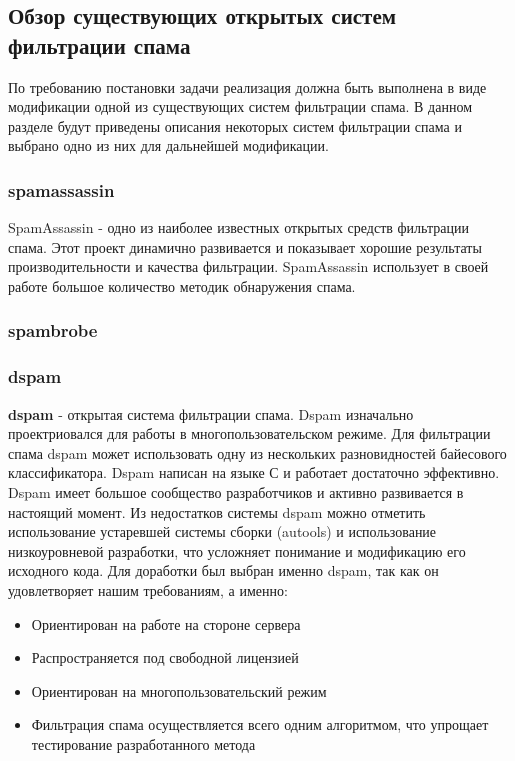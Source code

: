 \subsection{Обзор существующих открытых систем фильтрации спама}
По требованию постановки задачи реализация должна быть выполнена в виде модификации одной из существующих систем фильтрации спама. В данном разделе будут приведены описания некоторых систем фильтрации спама и выбрано одно из них для дальнейшей модификации.
\subsubsection{spamassassin}
SpamAssassin - одно из наиболее известных открытых средств фильтрации спама. Этот проект динамично развивается и показывает хорошие результаты производительности и качества фильтрации. SpamAssassin использует в своей работе большое количество методик обнаружения спама.
\subsubsection{spambrobe}


\subsubsection{dspam}
\textbf{dspam} - открытая система фильтрации спама. Dspam изначально проектриовался для работы в многопользовательском режиме.
Для фильтрации спама dspam может использовать одну из нескольких разновидностей байесового классификатора.
Dspam написан на языке С и работает достаточно эффективно. Dspam имеет большое сообщество разработчиков и активно развивается в настоящий момент.
Из недостатков системы dspam можно отметить использование устаревшей системы сборки (autools) и использование низкоуровневой разработки, что усложняет понимание и модификацию его исходного кода.
Для доработки был выбран именно dspam, так как он удовлетворяет нашим требованиям, а именно:
\begin{itemize}
\item Ориентирован на работе на стороне сервера
\item Распространяется под свободной лицензией
\item Ориентирован на многопользовательский режим
\item Фильтрация спама осуществляется  всего одним алгоритмом, что упрощает тестирование разработанного метода
\end{itemize}
